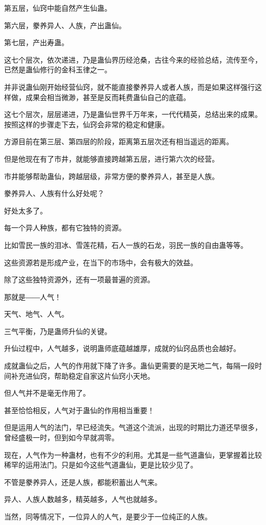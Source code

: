 \begin{this_body}
第五层，仙窍中能自然产生仙蛊。

第六层，豢养异人、人族，产出蛊仙。

第七层，产出寿蛊。

这七个层次，依次递进，乃是蛊仙界历经沧桑，古往今来的经验总结，流传至今，已然是蛊仙修行的金科玉律之一。

并非说蛊仙刚开始经营仙窍，就不能直接豢养异人或者人族，而是如果这样强行这样做，成果会相当微渺，甚至是反而耗费蛊仙自己的底蕴。

这七个层次，层层递进，乃是蛊仙世界千万年来，一代代精英，总结出来的成果。按照这样的步骤走下去，仙窍会非常的稳定和健康。

方源目前在第三层、第四层的阶段，距离第五层次还有相当遥远的距离。

但是他现在有了市井，就能够直接跨越第五层，进行第六次的经营。

市井能够帮助蛊仙，跨越层级，非常方便的豢养异人，甚至是人族。

豢养异人、人族有什么好处呢？

好处太多了。

每一个异人种族，都有它独特的资源。

比如雪民一族的泪冰、雪莲花精，石人一族的石龙，羽民一族的自由蛊等等。

这些资源若是形成产业，在当下的市场中，会有极大的效益。

除了这些独特资源外，还有一项最普遍的资源。

那就是――人气！

天气、地气、人气。

三气平衡，乃是蛊师升仙的关键。

升仙过程中，人气越多，说明蛊师底蕴越雄厚，成就的仙窍品质也会越好。

成就蛊仙之后，人气的作用就下降了许多。蛊仙更需要的是天地二气，每隔一段时间补充进仙窍，帮助稳定自家这片仙窍小天地。

但人气并不是毫无作用了。

甚至恰恰相反，人气对于蛊仙的作用相当重要！

但是运用人气的法门，早已经流失。气道这个流派，出现的时期比力道还早很多，曾经盛极一时，但到如今早就凋零。

现在，人气作为一种蛊材，也有不少的利用。尤其是一些气道蛊仙，更掌握着比较稀罕的运用法门。只是如今这些气道蛊仙，更是比较少见了。

不管是豢养异人，还是人族，都能积蓄出人气来。

异人、人族人数越多，精英越多，人气也就越多。

当然，同等情况下，一位异人的人气，是要少于一位纯正的人族。


\end{this_body}

